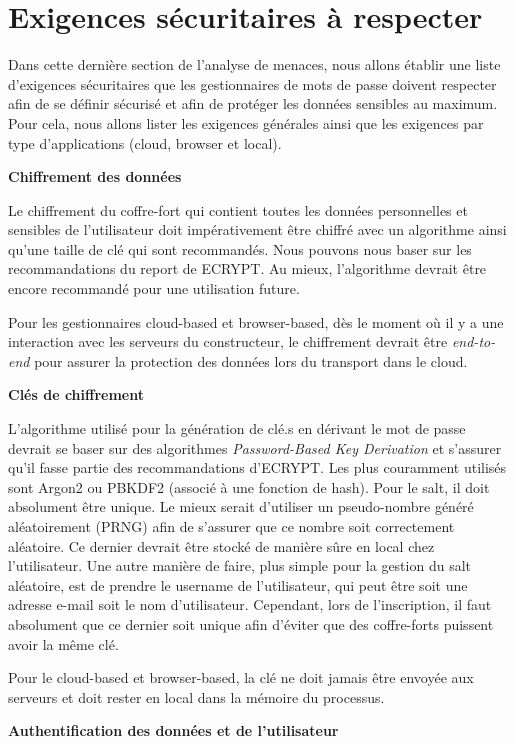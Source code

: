 \section{Exigences sécuritaires à respecter} 
Dans cette dernière section de l'analyse de menaces, nous allons établir une liste d'exigences sécuritaires que les gestionnaires de mots de passe doivent respecter afin de se définir sécurisé et afin de protéger les données sensibles au maximum. Pour cela, nous allons lister les exigences générales ainsi que les exigences par type d'applications (cloud, browser et local).

\textbf{Chiffrement des données}

Le chiffrement du coffre-fort qui contient toutes les données personnelles et sensibles de l'utilisateur doit impérativement être chiffré avec un algorithme ainsi qu'une taille de clé qui sont recommandés. Nous pouvons nous baser sur les recommandations du report de ECRYPT\cite{ecrypt}. Au mieux, l'algorithme devrait être encore recommandé pour une utilisation future.

Pour les gestionnaires cloud-based et browser-based, dès le moment où il y a une interaction avec les serveurs du constructeur, le chiffrement devrait être \textit{end-to-end} pour assurer la protection des données lors du transport dans le cloud.

\textbf{Clés de chiffrement}

L'algorithme utilisé pour la génération de clé.s en dérivant le mot de passe devrait se baser sur des algorithmes \textit{Password-Based Key Derivation} et s'assurer qu'il fasse partie des recommandations d'ECRYPT. Les plus couramment utilisés sont Argon2 ou PBKDF2 (associé à une fonction de hash). Pour le salt, il doit absolument être unique. Le mieux serait d'utiliser un pseudo-nombre généré aléatoirement (PRNG) afin de s'assurer que ce nombre soit correctement aléatoire. Ce dernier devrait être stocké de manière sûre en local chez l'utilisateur. Une autre manière de faire, plus simple pour la gestion du salt aléatoire, est de prendre le username de l'utilisateur, qui peut être soit une adresse e-mail soit le nom d'utilisateur. Cependant, lors de l'inscription, il faut absolument que ce dernier soit unique afin d'éviter que des coffre-forts puissent avoir la même clé.

Pour le cloud-based et browser-based, la clé ne doit jamais être envoyée aux serveurs et doit rester en local dans la mémoire du processus. 

\textbf{Authentification des données et de l'utilisateur}

